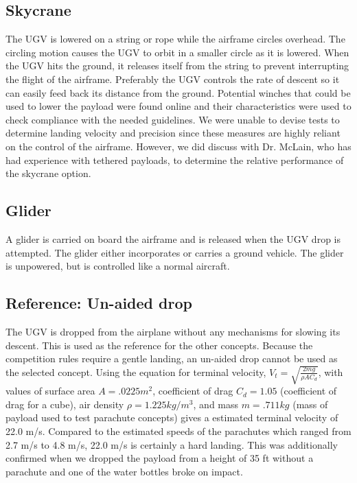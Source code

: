 \documentclass[]{auvsi_doc}
\begin{document}
\subsection{Skycrane}
The UGV is lowered on a string or rope while the airframe circles overhead. The circling motion causes the UGV to orbit in a smaller circle as it is lowered. When the UGV hits the ground, it releases itself from the string to prevent interrupting the flight of the airframe. Preferably the UGV controls the rate of descent so it can easily feed back its distance from the ground. Potential winches that could be used to lower the payload were found online and their characteristics were used to check compliance with the needed guidelines. We were unable to devise tests to determine landing velocity and precision since these measures are highly reliant on the control of the airframe. However, we did discuss with Dr. McLain, who has had experience with tethered payloads, to determine the relative performance of the skycrane option.

\subsection{Glider}
A glider is carried on board the airframe and is released when the UGV drop is attempted. The glider either incorporates or carries a ground vehicle. The glider is unpowered, but is controlled like a normal aircraft. 

\subsection{Reference: Un-aided drop} 
The UGV is dropped from the airplane without any mechanisms for slowing its descent. This is used as the reference for the other concepts. Because the competition rules require a gentle landing, an un-aided drop cannot be used as the selected concept. Using the equation for terminal velocity, $V_t = \sqrt{\frac{2mg}{\rho A C_d}}$, with values of  surface area $A = .0225 m^2$, coefficient of drag $C_d = 1.05$ (coefficient of drag for a cube), air density $\rho = 1.225 kg/m^3$, and mass $m = .711 kg$ (mass of payload used to test parachute concepts) gives a estimated terminal velocity of 22.0 m/s. Compared to the estimated speeds of the parachutes which ranged from 2.7 m/s to 4.8 m/s, 22.0 m/s is certainly a hard landing. This was additionally confirmed when we dropped the payload from a height of 35 ft without a parachute and one of the water bottles broke on impact.
\end{document}
